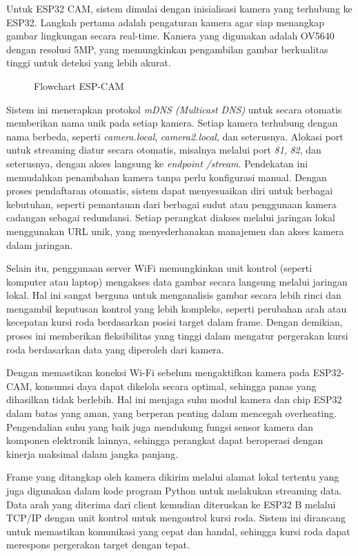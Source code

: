 Untuk ESP32 CAM, sistem dimulai dengan inisialisasi kamera yang terhubung ke ESP32. Langkah pertama adalah pengaturan kamera agar siap menangkap gambar lingkungan secara real-time. Kamera yang digunakan adalah OV5640 dengan resolusi 5MP, yang memungkinkan pengambilan gambar berkualitas tinggi untuk deteksi yang lebih akurat.

\begin{figure}[H]
  \centering
  \resizebox{.7\linewidth}{!}{
    
  }
  \caption{Flowchart ESP-CAM}
\end{figure}

Sistem ini menerapkan protokol \emph{mDNS (Multicast DNS)} untuk secara otomatis memberikan nama unik pada setiap kamera. Setiap kamera terhubung dengan nama berbeda, seperti \emph{camera.local}, \emph{camera2.local}, dan seterusnya. Alokasi port untuk streaming diatur secara otomatis, misalnya melalui port \emph{81}, \emph{82}, dan seterusnya, dengan akses langsung ke \emph{endpoint} \emph{/stream}. Pendekatan ini memudahkan penambahan kamera tanpa perlu konfigurasi manual. Dengan proses pendaftaran otomatis, sistem dapat menyesuaikan diri untuk berbagai kebutuhan, seperti pemantauan dari berbagai sudut atau penggunaan kamera cadangan sebagai redundansi. Setiap perangkat diakses melalui jaringan lokal menggunakan URL unik, yang menyederhanakan manajemen dan akses kamera dalam jaringan.

Selain itu, penggunaan server WiFi memungkinkan unit kontrol (seperti komputer atau laptop) mengakses data gambar secara langsung melalui jaringan lokal. Hal ini sangat berguna untuk menganalisis gambar secara lebih rinci dan mengambil keputusan kontrol yang lebih kompleks, seperti perubahan arah atau kecepatan kursi roda berdasarkan posisi target dalam frame. Dengan demikian, proses ini memberikan fleksibilitas yang tinggi dalam mengatur pergerakan kursi roda berdasarkan data yang diperoleh dari kamera.

Dengan memastikan koneksi Wi-Fi sebelum mengaktifkan kamera pada ESP32-CAM, konsumsi daya dapat dikelola secara optimal, sehingga panas yang dihasilkan tidak berlebih. Hal ini menjaga suhu modul kamera dan chip ESP32 dalam batas yang aman, yang berperan penting dalam mencegah overheating. Pengendalian suhu yang baik juga mendukung fungsi sensor kamera dan komponen elektronik lainnya, sehingga perangkat dapat beroperasi dengan kinerja maksimal dalam jangka panjang.

Frame yang ditangkap oleh kamera dikirim melalui alamat lokal tertentu yang juga digunakan dalam kode program Python untuk melakukan streaming data. Data arah yang diterima dari client kemudian diteruskan ke ESP32 B melalui TCP/IP dengan unit kontrol untuk mengontrol kursi roda. Sistem ini dirancang untuk memastikan komunikasi yang cepat dan handal, sehingga kursi roda dapat merespons pergerakan target dengan tepat.

